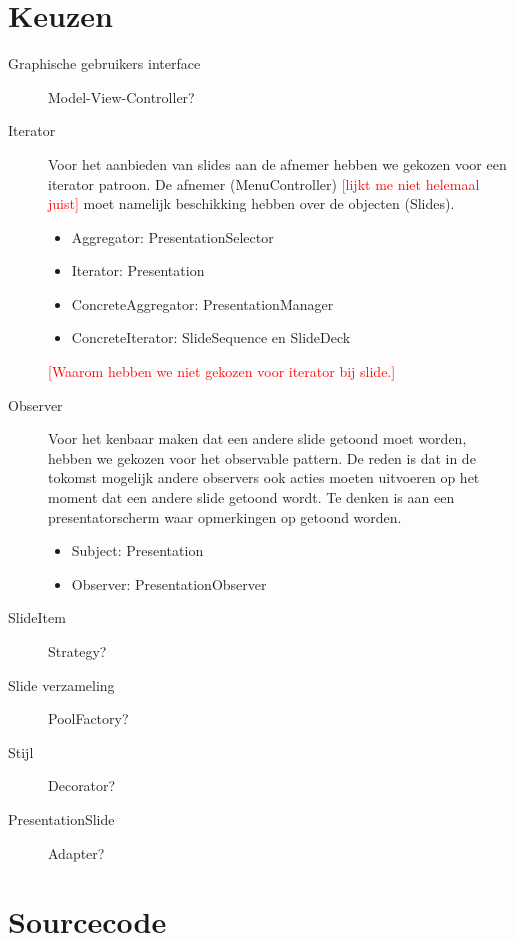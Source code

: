 \documentclass[a4paper]{article}
\newcommand{\todo}[1]{\textcolor{red}{[#1]}}
\begin{document}
\section{Keuzen}
\begin{description}
\item[Graphische gebruikers interface] Model-View-Controller?
\item[Iterator] Voor het aanbieden van slides aan de afnemer hebben we gekozen voor een iterator patroon. De afnemer (MenuController) \todo{lijkt me niet helemaal juist} moet namelijk beschikking hebben over de objecten (Slides).
\begin{itemize}
\item Aggregator: PresentationSelector
\item Iterator: Presentation
\item ConcreteAggregator: PresentationManager
\item ConcreteIterator: SlideSequence en SlideDeck
\end{itemize}
 \todo{Waarom hebben we niet gekozen voor iterator bij slide.}
 \item[Observer] Voor het kenbaar maken dat een andere slide getoond moet worden, hebben we gekozen voor het observable pattern. De reden is dat in de tokomst mogelijk andere observers ook acties moeten uitvoeren op het moment dat een andere slide getoond wordt. Te denken is aan een presentatorscherm waar opmerkingen op getoond worden.
 \begin{itemize}
\item Subject: Presentation
\item Observer: PresentationObserver
\end{itemize}
 
\item[SlideItem] Strategy?
\item[Slide verzameling] PoolFactory?
\item[Stijl] Decorator?
\item[PresentationSlide] Adapter?
\end{description}

\section{Sourcecode}
\end{document}
